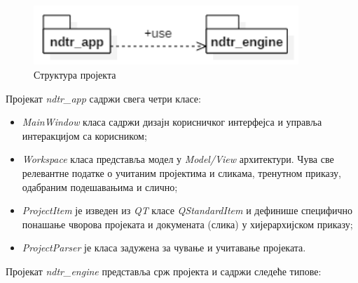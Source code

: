 \documentclass[12pt,a4paper,serbian,oneside]{book}
\begin{document}
\begin{figure}[H]
\begin{center}
\includegraphics[width=100mm]{images/struktura.png}
\end{center}
\caption{Структура пројекта}
\label{fig:struktura}
\end{figure}

Пројекат \textit{ndtr\_app} садржи свега четри класе:

\begin{itemize}
  \item \textit{MainWindow} класа садржи дизајн корисничког интерфејса и управља интеракцијом са корисником;
  \item \textit{Workspace} класа представља модел у \textit{Model/View} архитектури. Чува све релевантне податке о учитаним пројектима и сликама, тренутном приказу, одабраним подешавањима и слично;
  \item \textit{ProjectItem} је изведен из \textit{QT} класе \textit{QStandardItem} и дефинише специфично понашање чворова пројеката и докумената (слика) у хијерархијском приказу;
  \item \textit{ProjectParser} је класа задужена за чување и учитавање пројеката.
\end{itemize}

Пројекат \textit{ndtr\_engine} представља срж пројекта и садржи следеће типове:
\end{document}
